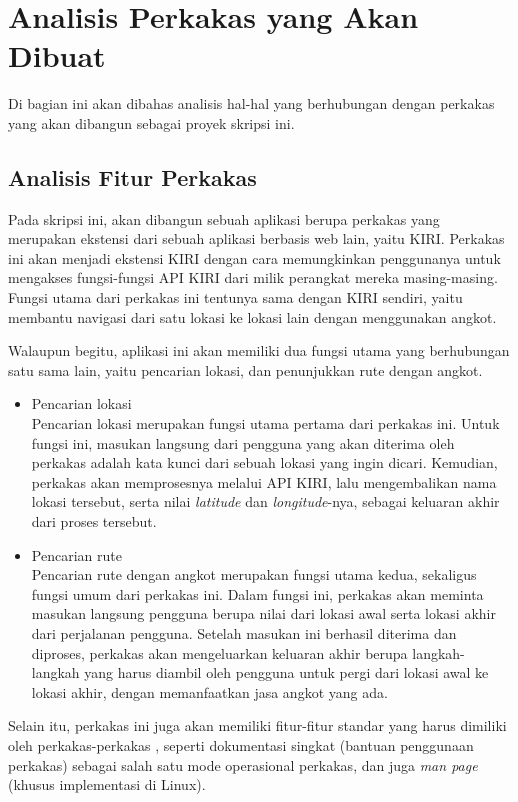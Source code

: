 \section{Analisis Perkakas yang Akan Dibuat}
\label{sec:analysis-thesisapp}

Di bagian ini akan dibahas analisis hal-hal yang berhubungan dengan perkakas yang akan dibangun sebagai proyek skripsi ini.

\subsection{Analisis Fitur Perkakas}
\label{sec:analysis-thesisapp-features}

Pada skripsi ini, akan dibangun sebuah aplikasi berupa perkakas \cl yang merupakan ekstensi dari sebuah aplikasi berbasis web lain, yaitu KIRI. Perkakas ini akan menjadi ekstensi KIRI dengan cara memungkinkan penggunanya untuk mengakses fungsi-fungsi API KIRI dari \cl milik perangkat mereka masing-masing. Fungsi utama dari perkakas ini tentunya sama dengan KIRI sendiri, yaitu membantu navigasi dari satu lokasi ke lokasi lain dengan menggunakan angkot.

Walaupun begitu, aplikasi ini akan memiliki dua fungsi utama yang berhubungan satu sama lain, yaitu pencarian lokasi, dan penunjukkan rute dengan angkot.

\begin{itemize}
	\item Pencarian lokasi\\
	Pencarian lokasi merupakan fungsi utama pertama dari perkakas ini. Untuk fungsi ini, masukan langsung dari pengguna yang akan diterima oleh perkakas adalah kata kunci dari sebuah lokasi yang ingin dicari. Kemudian, perkakas akan memprosesnya melalui API KIRI, lalu mengembalikan nama lokasi tersebut, serta nilai \textit{latitude} dan \textit{longitude}-nya, sebagai keluaran akhir dari proses tersebut.
	\item Pencarian rute\\
	Pencarian rute dengan angkot merupakan fungsi utama kedua, sekaligus fungsi umum dari perkakas ini. Dalam fungsi ini, perkakas akan meminta masukan langsung pengguna berupa nilai \latlon dari lokasi awal serta lokasi akhir dari perjalanan pengguna. Setelah masukan ini berhasil diterima dan diproses, perkakas akan mengeluarkan keluaran akhir berupa langkah-langkah yang harus diambil oleh pengguna untuk pergi dari lokasi awal ke lokasi akhir, dengan memanfaatkan jasa angkot yang ada.
\end{itemize}
\noindent
Selain itu, perkakas ini juga akan memiliki fitur-fitur standar yang harus dimiliki oleh perkakas-perkakas \cl, seperti dokumentasi singkat (bantuan penggunaan perkakas) sebagai salah satu mode operasional perkakas, dan juga \textit{man page} (khusus implementasi di Linux).

